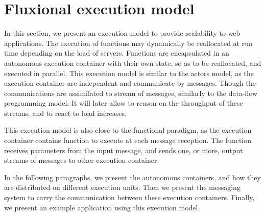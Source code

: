 \section{Fluxional execution model} \label{section:model}




In this section, we present an execution model to provide scalability to web applications.
The execution of functions may dynamically be reallocated at run time depending on the load of servers.
Functions are encapsulated in an autonomous execution container with their own state, so as to be reallocated, and executed in parallel.
This execution model is similar to the actors model, as the execution container are independent and communicate by messages.
Though the communications are assimilated to stream of messages, similarly to the data-flow programming model.
It will later allow to reason on the throughput of these streams, and to react to load increases.

This execution model is also close to the functional paradigm, as the execution container contains function to execute at each message reception.
The function receives parameters from the input message, and sends one, or more, output streams of messages to other execution container.

In the following paragraphs, we present the autonomous containers, and how they are distributed on different execution units.
Then we present the messaging system to carry the communication between these execution containers.
Finally, we present an example application using this execution model.

